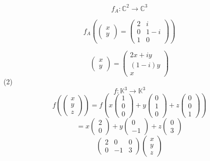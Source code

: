 \documentclass[12pt]{article}
\begin{document}
\[f_A: \mathbb{C}^2 \rightarrow \mathbb{C}^3\]

\[f_A \left(\begin{pmatrix}
    x\\
    y
\end{pmatrix} = \begin{pmatrix}
    2 & i\\
    0 & 1-i\\
    1 & 0
\end{pmatrix}\right)\]

\[\begin{pmatrix}
    x\\
    y
\end{pmatrix} = \begin{pmatrix}
    2x+ iy\\
    (1-i)y\\
    x
\end{pmatrix}\]
(2)
\[f: \mathbb{K}^3 \rightarrow \mathbb{K}^3\]
\[f \left(\begin{pmatrix}
    x\\
    y\\
    z
\end{pmatrix}\right) = f\left(x\begin{pmatrix}
    1\\
    0\\
    0
\end{pmatrix} + y\begin{pmatrix}
    0\\
    1\\
    0
\end{pmatrix} +z \begin{pmatrix}
    0\\
    0\\
    1
\end{pmatrix}\right)\]
\[= x\begin{pmatrix}
    2\\
    0
\end{pmatrix} + y \begin{pmatrix}
    0\\
    -1
\end{pmatrix} + z \begin{pmatrix}
    0\\
    3
\end{pmatrix}\]
\[\begin{pmatrix}
    2 & 0 & 0\\
    0 & -1 & 3
\end{pmatrix} \begin{pmatrix}
    x\\
    y\\
    z
\end{pmatrix}\]
\end{document}
